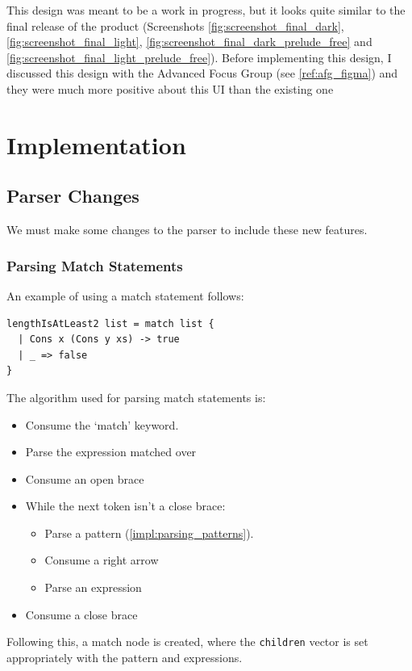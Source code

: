 This design was meant to be a work in progress, but it looks quite similar to the final release of the product (Screenshots \ref{fig:screenshot_final_dark}, \ref{fig:screenshot_final_light}, \ref{fig:screenshot_final_dark_prelude_free} and \ref{fig:screenshot_final_light_prelude_free}). Before implementing this design, I discussed this design with the Advanced Focus Group (see \ref{ref:afg_figma}) and they were much more positive about this UI than the existing one 

\section{Implementation}
\subsection{Parser Changes}
We must make some changes to the parser to include these new features.

\subsubsection{Parsing Match Statements}
An example of using a match statement follows:
\begin{verbatim}
lengthIsAtLeast2 list = match list {
  | Cons x (Cons y xs) -> true
  | _ => false
}
\end{verbatim}

The algorithm used for parsing match statements is:
\begin{itemize}
    \item Consume the `match' keyword.
    \item Parse the expression matched over
    \item Consume an open brace
    \item While the next token isn't a close brace: \begin{itemize}
        \item Parse a pattern (\ref{impl:parsing_patterns}).
        \item Consume a right arrow
        \item Parse an expression
    \end{itemize}
    \item Consume a close brace
\end{itemize}
Following this, a match node is created, where the \verb|children| vector is set appropriately with the pattern and expressions.

